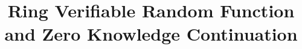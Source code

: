 \documentclass{llncs}
\title{Ring Verifiable Random Function and Zero Knowledge Continuation}
\def\eprint#1#2{#2} %
\begin{document}
	
\maketitle

\begin{abstract}

\end{abstract}



% 



%  









\appendix


\eprint{}{}



\end{document}
